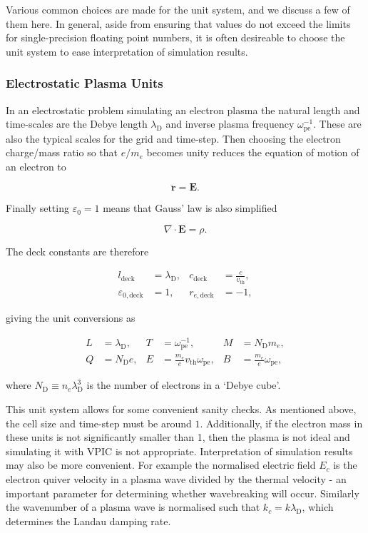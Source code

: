 \documentclass[twocolumn,10pt]{article}
\renewcommand{\vec}[1]{\mathbf{#1}}
\newcommand{\omegap}{\omega_{\mathrm{pe}}}
\newcommand{\vth}{v_{\mathrm{th}}}
\newcommand{\ldebye}{\lambda_{\mathrm{D}}}
\begin{document}
	Various common choices are made for the unit system, and we discuss a few of them here. In general, aside from ensuring that values do not exceed the limits for single-precision floating point numbers, it is often desireable to choose the unit system to ease interpretation of simulation results.

	\subsubsection{Electrostatic Plasma Units}

	In an electrostatic problem simulating an electron plasma the natural length and time-scales are the Debye length $\ldebye$ and inverse plasma frequency $\omegap^{-1}$. These are also the typical scales for the grid and time-step. Then choosing the electron charge/mass ratio so that $e/m_e$ becomes unity reduces the equation of motion of an electron to

	\begin{equation*}
		\ddot{\vec{r}} = \vec{E}.
	\end{equation*}

	\noindent Finally setting $\varepsilon_0=1$ means that Gauss' law is also simplified

	\begin{equation*}
		\nabla \cdot \vec{E} = \rho.
	\end{equation*}

	The deck constants are therefore

	\begin{align*}
		l_{\mathrm{deck}} &= \ldebye, &
		c_{\mathrm{deck}} &= \frac{c}{\vth}, \\
		\varepsilon_{0,\mathrm{deck}} &= 1, &
		r_{e,\mathrm{deck}} &= -1,
	\end{align*}

	\noindent giving the unit conversions as

	\begin{align*}
		L &= \ldebye, &
		T &= \omegap^{-1}, &
		M &= N_{\mathrm{D}}m_e, \\
		Q &= N_{\mathrm{D}}e, &
		E &= \frac{m_e}{e}\vth\omegap, &
		B &= \frac{m_e}{e}\omegap,
	\end{align*}

	\noindent where $N_{\mathrm{D}} \equiv n_e\ldebye^3$ is the number of electrons in a `Debye cube'.

	This unit system allows for some convenient sanity checks. As mentioned above, the cell size and time-step must be around $1$. Additionally, if the electron mass in these units is not significantly smaller than 1, then the plasma is not ideal and simulating it with VPIC is not appropriate. Interpretation of simulation results may also be more convenient. For example the normalised electric field $E_c$ is the electron quiver velocity in a plasma wave divided by the thermal velocity - an important parameter for determining whether wavebreaking will occur. Similarly the wavenumber of a plasma wave is normalised such that $k_c = k\ldebye$, which determines the Landau damping rate.
\end{document}
